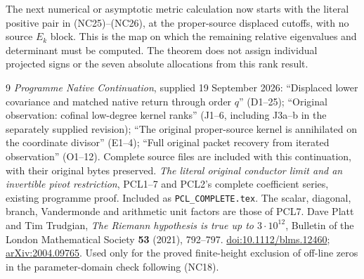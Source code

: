 \documentclass[11pt]{article}
\begin{document}
The next numerical or asymptotic metric calculation now starts with
the literal positive pair in (NC25)--(NC26), at the proper-source
displaced cutoffs, with no source $E_k$ block. This is the map on
which the remaining relative eigenvalues and determinant must be
computed. The theorem does not assign individual projected signs or
the seven absolute allocations from this rank result.

\begin{thebibliography}{9}
 \emph{Programme Native Continuation}, supplied
19 September 2026: ``Displaced lower covariance and matched native
return through order $q$'' (D1--25); ``Original observation: cofinal
low-degree kernel ranks'' (J1--6, including J3a--b in the separately
supplied revision); ``The original proper-source kernel is annihilated
on the coordinate divisor'' (E1--4); ``Full original packet recovery
from iterated observation'' (O1--12). Complete source files are
included with this continuation, with their original bytes preserved.
 \emph{The literal original conductor limit and an
invertible pivot restriction}, PCL1--7 and PCL2's complete coefficient
series, existing programme proof. Included as
\texttt{PCL\_COMPLETE.tex}. The scalar, diagonal, branch,
Vandermonde and arithmetic unit factors are those of PCL7.
 Dave Platt and Tim Trudgian,
\emph{The Riemann hypothesis is true up to $3\cdot10^{12}$},
Bulletin of the London Mathematical Society \textbf{53} (2021),
792--797. \href{https://doi.org/10.1112/blms.12460}{doi:10.1112/blms.12460};
\href{https://arxiv.org/abs/2004.09765}{arXiv:2004.09765}.
Used only for the proved finite-height exclusion of off-line zeros in
the parameter-domain check following (NC18).
\end{thebibliography}
\end{document}
